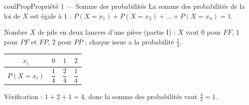 \documentclass[11pt,a4paper]{article}
\makeatletter
\newcounter{lycee@signet}
\newcommand{\signet}[3][]{\stepcounter{lycee@signet}%
  \edef\lycee@dest{\if\relax\detokenize{#1}\relax
    signet.\arabic{lycee@signet}\else#1\fi}%
  \hypertarget{\lycee@dest}{}\bookmark[level=#2,dest=\lycee@dest]{#3}}
\newenvironment{proprietebox}[1][Propriété]%
  {\begin{boitecours}[phantom={\signet{2}{#1}}]{coulProp}{#1}}{\end{boitecours}}
\makeatother
\begin{document}
\begin{proprietebox}[Propriété 1 --- Somme des probabilités]
La somme des probabilités de la loi de $X$ est égale à $1$ :
$P(X=x_1)+P(X=x_2)+\dots+P(X=x_n)=1$.
\end{proprietebox}

\begin{exemplebox}
Nombre $X$ de \og pile\fg{} en deux lancers d'une pièce (partie I) : $X$ vaut $0$ pour
$FF$, $1$ pour $PF$ et $FP$, $2$ pour $PP$ ; chaque issue a la probabilité $\frac{1}{4}$.
\begin{center}
\renewcommand{\arraystretch}{2.4}
\begin{tabular}{|c|c|c|c|}
\hline
$x_i$ & $0$ & $1$ & $2$\\
\hline
$P(X=x_i)$ & $\dfrac{1}{4}$ & $\dfrac{2}{4}$ & $\dfrac{1}{4}$\\
\hline
\end{tabular}
\end{center}
Vérification : $1+2+1=4$, donc la somme des probabilités vaut $\frac{4}{4}=1$.
\end{exemplebox}
\end{document}
